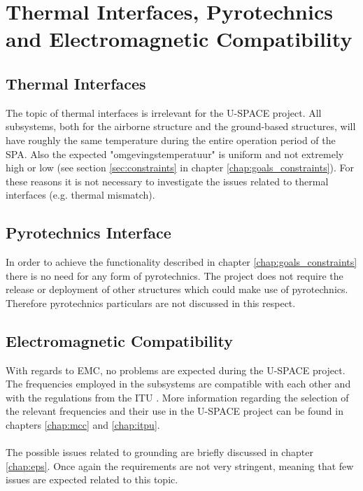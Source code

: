 \chapter{Thermal Interfaces, Pyrotechnics and Electromagnetic Compatibility}
\label{chap:thermal_pyro_emc}

\section{Thermal Interfaces}

The topic of thermal interfaces is irrelevant for the \ac{U-SPACE} project. All subsystems, both for the airborne structure and the ground-based structures, will have roughly the same temperature during the entire operation period of the \ac{SPA}. Also the expected "omgevingstemperatuur" is uniform and not extremely high or low (see section \ref{sec:constraints} in chapter \ref{chap:goals_constraints}). For these reasons it is not necessary to investigate the issues related to thermal interfaces (e.g. thermal mismatch).

\section{Pyrotechnics Interface}

In order to achieve the functionality described in chapter \ref{chap:goals_constraints} there is no need for any form of pyrotechnics. The project does not require the release or deployment of other structures which could make use of pyrotechnics. Therefore pyrotechnics particulars are not discussed in this respect.

\section{Electromagnetic Compatibility}

With regards to \ac{EMC}, no problems are expected during the \ac{U-SPACE} project. The frequencies employed in the subsystems are compatible with each other and with the regulations from the \ac{ITU} \cite{book:freqalloc}. More information regarding the selection of the relevant frequencies and their use in the \ac{U-SPACE} project can be found in chapters \ref{chap:mcc} and \ref{chap:itpu}.
\\
\\
The possible issues related to grounding are briefly discussed in chapter \ref{chap:eps}. Once again the requirements are not very stringent, meaning that few issues are expected related to this topic.